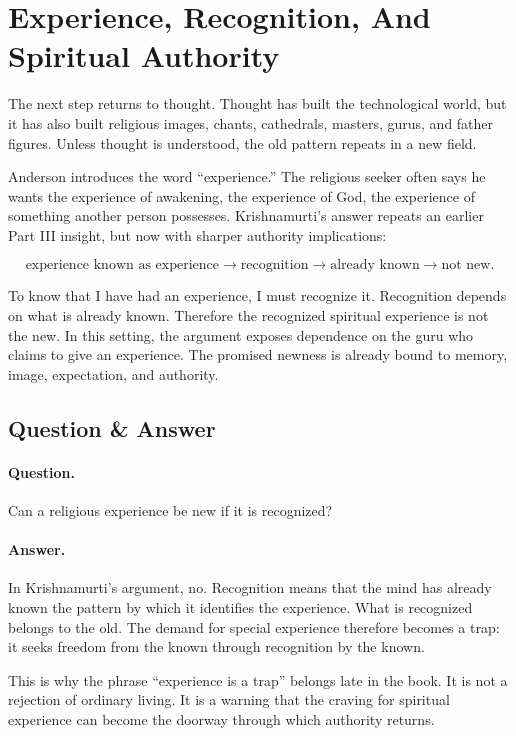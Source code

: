 \documentclass[11pt,oneside]{book}
\begin{document}
\section{Experience, Recognition, And Spiritual Authority}

The next step returns to thought. Thought has built the technological world, but it has also built religious images, chants, cathedrals, masters, gurus, and father figures. Unless thought is understood, the old pattern repeats in a new field.

Anderson introduces the word ``experience.'' The religious seeker often says he wants the experience of awakening, the experience of God, the experience of something another person possesses. Krishnamurti's answer repeats an earlier Part III insight, but now with sharper authority implications:

\begin{equation}
\text{experience known as experience}
\longrightarrow
\text{recognition}
\longrightarrow
\text{already known}
\longrightarrow
\text{not new}.
\end{equation}

To know that I have had an experience, I must recognize it. Recognition depends on what is already known. Therefore the recognized spiritual experience is not the new. In this setting, the argument exposes dependence on the guru who claims to give an experience. The promised newness is already bound to memory, image, expectation, and authority.

\subsection{Question \& Answer}

\paragraph{Question.}
Can a religious experience be new if it is recognized?

\paragraph{Answer.}
In Krishnamurti's argument, no. Recognition means that the mind has already known the pattern by which it identifies the experience. What is recognized belongs to the old. The demand for special experience therefore becomes a trap: it seeks freedom from the known through recognition by the known.

This is why the phrase ``experience is a trap'' belongs late in the book. It is not a rejection of ordinary living. It is a warning that the craving for spiritual experience can become the doorway through which authority returns.
\end{document}
